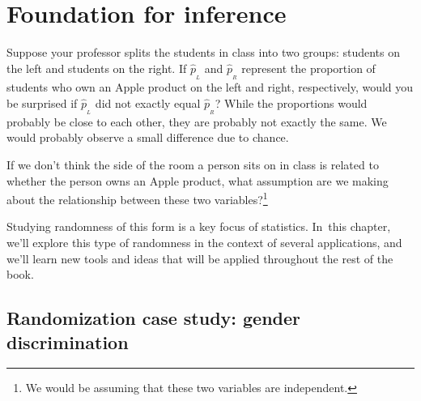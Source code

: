 
\chapter{Foundation for inference}
\label{FoundationForInference}




\begin{example}{Suppose your professor splits the students in class into two groups: students on the left and students on the right. If $\hat{p}_{_L}$ and $\hat{p}_{_R}$ represent the proportion of students who own an Apple product on the left and right, respectively, would you be surprised if $\hat{p}_{_L}$ did not {exactly} equal $\hat{p}_{_R}$?}\label{classRightLeftSideApple}
While the proportions would probably be close to each other, they are probably not exactly the same. We would probably observe a small difference due to {chance}.
\end{example}

\begin{exercise}
If we don't think the side of the room a person sits on in class is related to whether the person owns an Apple product, what assumption are we making about the relationship between these two variables?\footnote{We would be assuming that these two variables are independent.}
\end{exercise}

Studying randomness of this form is a key focus of statistics. In~this chapter, we'll explore this type of randomness in the context of several applications, and we'll learn new tools and ideas that will be applied throughout the rest of the book.



\section{Randomization case study: gender discrimination}
\label{caseStudyGenderDiscrimination}

